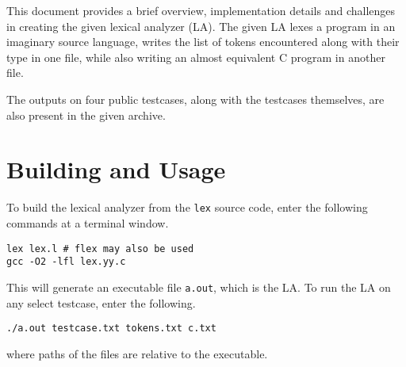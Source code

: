 \documentclass[journal,12pt,twocolumn]{IEEEtran}
\begin{document}
This document provides a brief overview, implementation details and challenges
in creating the given lexical analyzer (LA). The given LA lexes a program in an
imaginary source language, writes the list of tokens encountered along with
their type in one file, while also writing an almost equivalent C program in
another file.

The outputs on four public testcases, along with the testcases themselves, are
also present in the given archive.

\section{Building and Usage}

To build the lexical analyzer from the \texttt{lex} source code, enter the following
commands at a terminal window.

\begin{lstlisting}
lex lex.l # flex may also be used
gcc -O2 -lfl lex.yy.c 
\end{lstlisting}

This will generate an executable file \texttt{a.out}, which is the LA.
To run the LA on any select testcase, enter the following.

\begin{lstlisting}
./a.out testcase.txt tokens.txt c.txt
\end{lstlisting}

where paths of the files are relative to the executable.
\end{document}
